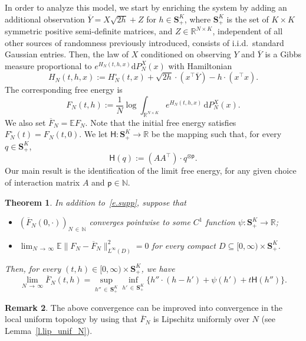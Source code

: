 \documentclass[10pt]{amsart}
\newtheorem{theo}{Theorem}[section]
\theoremstyle{definition}\newtheorem{defi}[theo]{Definition}\newtheorem{rema}[theo]{Remark}\newtheorem{exam}[theo]{Example}\newtheorem{exem}[theo]{Example}\newtheorem{nota}[theo]{Notation}
\newcommand{\N}{\mathbb{N}}
\newcommand{\R}{\mathbb{R}}
\newcommand{\E}{\mathbb{E}}
\renewcommand{\S}{\mathbf{S}}
\renewcommand{\d}{\mathrm{d}}
\renewcommand{\H}{\mathsf{H}}
\newcommand{\sfp}{\mathsf{p}}
\renewcommand{\subset}{\subseteq}
\renewcommand{\bar}{\overline}
\begin{document}
In order to analyze this model, we start by enriching the system by adding an additional observation $\bar Y=X\sqrt{2h}+Z$ for $h\in\S^K_+$, where $\S^K_+$ is the set of $K\times K$ symmetric positive semi-definite matrices, and {$Z\in \R^{N\times K}$, independent of all other sources of randomness previously introduced,} consists of i.i.d.\ standard Gaussian entries. Then, the law of $X$ conditioned on observing $Y$ and $\bar Y$ is a Gibbs measure {proportional to $e^{H_N(t,h,x)}\d P_N^X(x)$} with Hamiltonian
\begin{equation*}
H_N(t,h,x) := H^\circ_N(t,x)+ \sqrt{2h}\cdot\left(x^\intercal \bar Y\right)-h\cdot\left(x^\intercal x\right).
\end{equation*}
The corresponding free energy is
\begin{equation}\label{e.F_N}
F_N(t,h) := \frac{1}{N}\log\int_{\R^{N\times K}} e^{H_N(t,h,x)} \, \d P^X_N(x).
\end{equation}
We also set $\bar F_N = \E F_N$. Note that the initial free energy satisfies $F^\circ_N(t) = F_N(t,0)$. We let $\H:\S^K_+\to \R$ be the mapping such that, for every $q \in \S^K_+$,
\begin{equation}\label{def.H}
\H(q) := \left(AA^\intercal\right)\cdot q^{\otimes \sfp}.
\end{equation}
Our main result is the identification of the limit free energy, for any given choice of interaction matrix $A$ and $\sfp \in \N$.


\begin{theo}\label{main_thm}
In addition to~\eqref{e.supp}, suppose that
\begin{itemize}
\item $(\bar F_N(0,\cdot))_{N\,\in\,\N}$ converges pointwise to some $C^1$ function $\psi:\S^K_+\to \R$;
\item $\lim_{N\,\to\,\infty}\E\|F_N-\bar F_N\|^2_{L^\infty(D)}=0$ for every compact $D\subset [0,\infty)\times \S^K_+$.
\end{itemize}
Then, for every $(t,h)\in[0,\infty)\times \S^K_+$, we have
\begin{equation}\label{e.main_thm}
\lim_{N\,\to\,\infty}\bar F_N(t,h) = \sup_{h''\,\in\,\S^K_+}\inf_{h'\,\in\,\S^K_+}\big\{h''\cdot \left(h-h'\right)+\psi(h')+t\H(h'')\big\}.
\end{equation}
\end{theo}



\begin{rema}
The above convergence can be improved into convergence in the local uniform topology by using that $\bar F_N$ is Lipschitz uniformly over $N$ (see Lemma~\ref{l.lip_unif_N}).
\end{rema}
\end{document}
